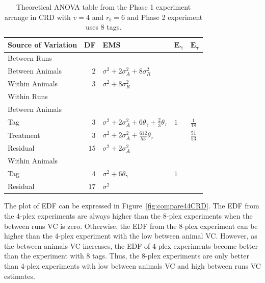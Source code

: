 \documentclass[12pt,a4paper]{article}
\begin{document}
\begin{table}[ht]
\centering
 \caption{Theoretical ANOVA table from the Phase 1 experiment arrange in CRD with $v = 4$ and $r_b = 6$ and Phase 2 experiment uses 8 tags.}
 \begin{tabular}[t]{lrlll} 
 \toprule 
 \multicolumn{1}{l}{\textbf{Source of Variation}} & \multicolumn{1}{l}{\textbf{DF}} & \multicolumn{1}{l}{\textbf{EMS}}& \multicolumn{1}{l}{$\bm{E_{\gamma}}$}&\multicolumn{1}{l}{$\bm{E_{\tau}}$}\\ 
 \midrule 
 Between Runs &  &  & & \\ 
 \quad Between Animals & $2$ & $\sigma^2+2\sigma_{A}^2+8\sigma_{R}^2$ & & \\  \quad Within Animals & $3$ & $\sigma^2+8\sigma_{R}^2$ & & \\ \hline 
 Within Runs &  &  & & \\ 
 \quad Between Animals &  &  & & \\ 
 \quad \quad Tag & $3$ & $\sigma^2+2\sigma_{A}^2+6\theta_{\gamma}+ \frac{2}{3}\theta_{\tau}$ &$1$ & $\frac{1}{18}$\\ 
 \quad \quad Treatment & $3$ & $\sigma^2+2\sigma_{A}^2+ \frac{612}{53}\theta_{\tau}$ & & $\frac{51}{53}$\\ 
 \quad \quad Residual & $15$ & $\sigma^2+2\sigma_{A}^2$ & & \\ \hline 
 \quad Within Animals &  &  & & \\ 
 \quad \quad Tag & $4$ & $\sigma^2+6\theta_{\gamma}$ &$1$ & \\ 
 \quad \quad Residual & $17$ & $\sigma^2$ & & \\ 
 \bottomrule 
 \end{tabular} 
 \label{tab:ANOVAPhase1CRD22} 
\end{table} 

The plot of EDF can be expressed in Figure~\ref{fig:compare44CRD}. The EDF from the 4-plex experiments are always higher than the 8-plex experiments when the between runs VC is zero. Otherwise, the EDF from the 8-plex experiment can be higher than the 4-plex experiment with the low between animal VC. However, as the between animals VC increases, the EDF of 4-plex experiments become better than the experiment with 8 tags. Thus, the 8-plex experiments are only better than 4-plex experiments with low between animals VC and high between runs VC estimates.
\end{document}
